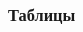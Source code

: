 \documentclass{beamer}
\begin{document}
\begin{frame}
  \frametitle{Таблицы}
  \begin{columns}
    \begin{column}{0.5\textwidth}
      \begin{figure}[h!]
      \end{figure}
    \end{column}
    \begin{column}{0.5\textwidth}
      \begin{figure}[h!]
      \end{figure}
    \end{column}
  \end{columns}  
\end{frame}
\end{document}
